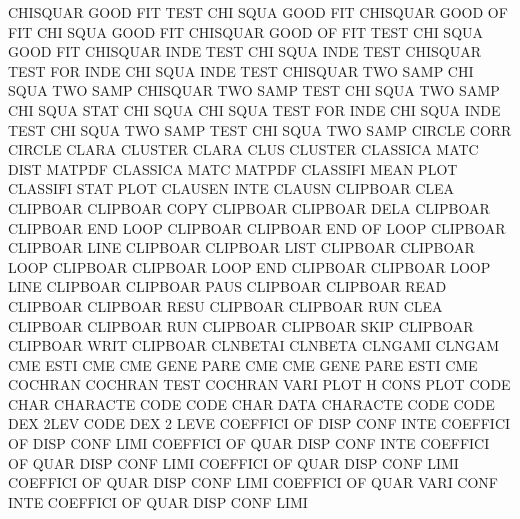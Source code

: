 CHISQUAR GOOD FIT  TEST                 CHI      SQUA GOOD FIT
CHISQUAR GOOD OF   FIT                  CHI      SQUA GOOD FIT
CHISQUAR GOOD OF   FIT  TEST            CHI      SQUA GOOD FIT
CHISQUAR INDE TEST                      CHI      SQUA INDE TEST
CHISQUAR TEST FOR  INDE                 CHI      SQUA INDE TEST
CHISQUAR TWO  SAMP                      CHI      SQUA TWO  SAMP
CHISQUAR TWO  SAMP TEST                 CHI      SQUA TWO  SAMP
CHI      SQUA STAT                      CHI      SQUA
CHI      SQUA TEST FOR  INDE            CHI      SQUA INDE TEST
CHI      SQUA TWO  SAMP TEST            CHI      SQUA TWO  SAMP
CIRCLE   CORR                           CIRCLE
CLARA                                   CLUSTER
CLARA    CLUS                           CLUSTER
CLASSICA MATC DIST                      MATPDF
CLASSICA MATC                           MATPDF
CLASSIFI MEAN PLOT                      CLASSIFI STAT PLOT
CLAUSEN  INTE                           CLAUSN
CLIPBOAR CLEA                           CLIPBOAR
CLIPBOAR COPY                           CLIPBOAR
CLIPBOAR DELA                           CLIPBOAR
CLIPBOAR END  LOOP                      CLIPBOAR
CLIPBOAR END  OF   LOOP                 CLIPBOAR
CLIPBOAR LINE                           CLIPBOAR
CLIPBOAR LIST                           CLIPBOAR
CLIPBOAR LOOP                           CLIPBOAR
CLIPBOAR LOOP END                       CLIPBOAR
CLIPBOAR LOOP LINE                      CLIPBOAR
CLIPBOAR PAUS                           CLIPBOAR
CLIPBOAR READ                           CLIPBOAR
CLIPBOAR RESU                           CLIPBOAR
CLIPBOAR RUN  CLEA                      CLIPBOAR
CLIPBOAR RUN                            CLIPBOAR
CLIPBOAR SKIP                           CLIPBOAR
CLIPBOAR WRIT                           CLIPBOAR
CLNBETAI                                CLNBETA
CLNGAMI                                 CLNGAM
CME      ESTI                           CME
CME      GENE PARE                      CME
CME      GENE PARE ESTI                 CME
COCHRAN                                 COCHRAN  TEST
COCHRAN  VARI PLOT                      H        CONS PLOT
CODE     CHAR                           CHARACTE CODE
CODE     CHAR DATA                      CHARACTE CODE
CODE     DEX  2LEV                      CODE     DEX  2    LEVE
COEFFICI OF   DISP CONF INTE            COEFFICI OF   DISP CONF LIMI
COEFFICI OF   QUAR DISP CONF INTE       COEFFICI OF   QUAR DISP CONF LIMI
COEFFICI OF   QUAR DISP CONF LIMI       COEFFICI OF   QUAR DISP CONF LIMI
COEFFICI OF   QUAR VARI CONF INTE       COEFFICI OF   QUAR DISP CONF LIMI
